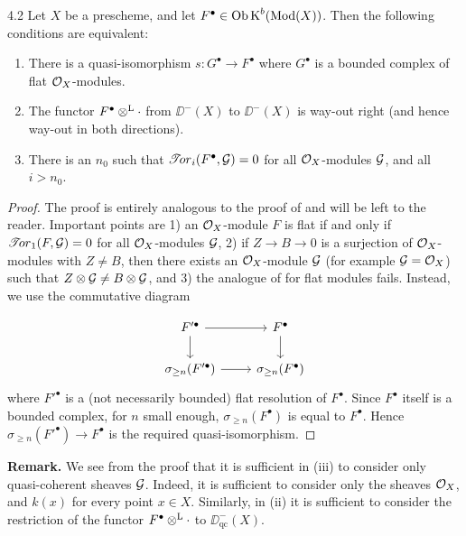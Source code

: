 \begin{bookproposition}{4.2}\label{prop:2.4.2}
Let $X$ be a prescheme, and let $F^\bullet\in\operatorname{Ob}\operatorname{K}^b(\operatorname{Mod}(X))$. Then the following conditions are equivalent:
\begin{enumerate}
\item[(i)] There is a quasi-isomorphism $s\colon G^\bullet\to F^\bullet$ where $G^\bullet$ is a bounded complex of flat $\mathcal{O}_X$-modules.
\item[(ii)] The functor $F^\bullet\mathbin{\otimes^{\mathrm{L}}}\cdot$ from $\DD^-(X)$ to $\DD^-(X)$ is way-out right (and hence way-out in both directions).
\item[(iii)] There is an $n_0$ such that $\mathop{\mathscr{T}\!or}\nolimits_i(F^\bullet,\mathcal{G})=0$ for all $\mathcal{O}_X$-modules $\mathcal{G}$, and all $i>n_0$.
\end{enumerate}
\end{bookproposition}

\begin{proof}
The proof is entirely analogous to the proof of  and will be left to the reader. Important points are 1) an $\mathcal{O}_X$-module $F$ is flat if and only if $\mathop{\mathscr{T}\!or}\nolimits_1(F,\mathcal{G})=0$ for all $\mathcal{O}_X$-modules $\mathcal{G}$, 2) if $Z\to B\to 0$ is a surjection of $\mathcal{O}_X$-modules with $Z\neq B$, then there exists an $\mathcal{O}_X$-module $\mathcal{G}$ (for example $\mathcal{G}=\mathcal{O}_X$) such that $Z\otimes\mathcal{G}\neq B\otimes\mathcal{G}$, and 3) the analogue of  for flat modules fails. Instead, we use the commutative diagram

\[
\begin{tikzcd}
F'^\bullet \arrow[r] \arrow[d] & F^\bullet \arrow[d] \\
\sigma_{\ge n}(F'^\bullet) \arrow[r] & \sigma_{\ge n}(F^\bullet)
\end{tikzcd}
\]
where $F'^\bullet$ is a (not necessarily bounded) flat resolution of $F^\bullet$. Since $F^\bullet$ itself is a bounded complex, for $n$ small enough, $\sigma_{\ge n}(F^\bullet)$ is equal to $F^\bullet$. Hence $\sigma_{\ge n}(F'^\bullet)\to F^\bullet$ is the required quasi-isomorphism.
\end{proof}

\textbf{Remark.}
We see from the proof that it is sufficient in (iii) to consider only quasi-coherent sheaves $\mathcal{G}$. Indeed, it is sufficient to consider only the sheaves $\mathcal{O}_X$, and $k(x)$ for every point $x\in X$. Similarly, in (ii) it is sufficient to consider the restriction of the functor $F^\bullet\mathbin{\otimes^{\mathrm{L}}}\cdot$ to $\DD_{\mathrm{qc}}^-(X)$.

